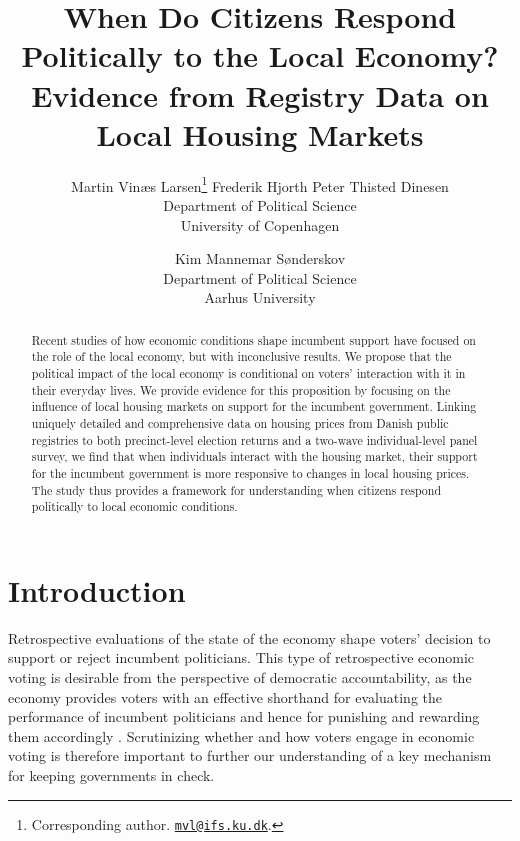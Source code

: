 \documentclass[12pt,a4paper]{article}
\title{\textbf{\Large{When Do Citizens Respond Politically to the Local Economy? Evidence from Registry Data on Local Housing Markets}}}
\author{Martin Vinæs Larsen\thanks{Corresponding author. \href{mailto:mvl@ifs.ku.dk}{\texttt{mvl@ifs.ku.dk}}. } \qquad Frederik Hjorth \qquad Peter Thisted  Dinesen \\Department of Political Science \\ University of Copenhagen \and Kim Mannemar  Sønderskov  \\Department of Political Science \\ Aarhus University   }
\begin{document}
	
	\maketitle
	
	\begin{abstract} \noindent Recent studies of how economic conditions shape incumbent support have focused on the role of the local economy, but with inconclusive results. We propose that the political impact of the local economy is conditional on voters’ interaction with it in their everyday lives. We provide evidence for this proposition by focusing on the influence of local housing markets on support for the incumbent government. Linking uniquely detailed and comprehensive data on housing prices from Danish public registries to both precinct-level election returns and a two-wave individual-level panel survey, we find that when individuals interact with the housing market, their support for the incumbent government is more responsive to changes in local housing prices. The study thus provides a framework for understanding when citizens respond politically to local economic conditions.
	\end{abstract}
	
	\section{Introduction}
	
	
	\doublespacing
	\noindent Retrospective evaluations of the state of the economy shape voters' decision to support or reject incumbent politicians. This type of retrospective economic voting is desirable from the perspective of democratic accountability, as the economy provides voters with an effective shorthand for evaluating the performance of incumbent politicians and hence for punishing and rewarding them accordingly \citep{ashworth2012electoral,healy2013retrospective}. Scrutinizing whether and how voters engage in economic voting is therefore important to further our understanding of a key mechanism for keeping governments in check. 
	
\end{document}
